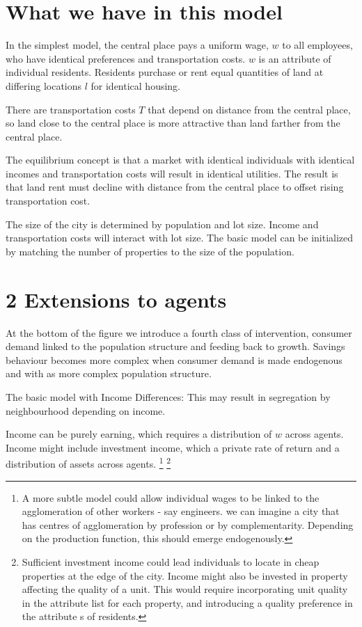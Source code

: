 \section{What we have in this model}
In the simplest model, the central place pays a uniform wage, $w$ to all employees, who have identical preferences and transportation costs. $w$ is an attribute of individual residents. Residents purchase or rent equal quantities of land at differing locations $l$ for identical housing.  

There are transportation costs $T$ that depend on distance from the central place, so land close to the central place is more attractive than land farther from the central place.  

The equilibrium concept is that a market with identical individuals with identical incomes and transportation costs will result in identical utilities. The result is that land rent must decline with distance from the central place to offset rising transportation cost. 

The size of the city is determined by population and lot size. Income and transportation costs will interact with lot size. The basic model can be initialized by matching the number of properties to the size of the population. 


\section{2 Extensions to agents} %


At the bottom of the figure we introduce a fourth class of intervention, consumer demand linked to the population structure and feeding back to growth. Savings behaviour becomes more  complex when consumer demand is made endogenous and with as more complex population structure.

 The basic model with Income Differences: This may result in segregation by neighbourhood depending on income. 

Income can be purely earning, which requires a distribution of $w$ across agents. Income  might include investment income, which  a private rate of return and a distribution of assets across agents. \footnote{A more subtle model could allow individual wages to be linked to the agglomeration of other workers - say engineers. we can imagine a city that has centres of agglomeration by profession or by complementarity. Depending on the production function, this should emerge endogenously.}
\footnote{Sufficient investment income could lead individuals to locate in cheap properties at the edge of the city.  Income might also be invested in property affecting the quality of a unit. This would require incorporating unit quality in the attribute list for each property, and introducing a quality preference  in the attribute s of residents.}



